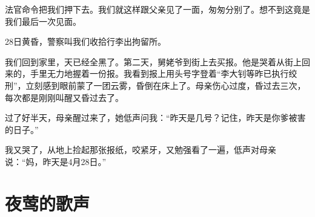 \documentclass[12pt,UTF-8,openany]{ctexbook}
\begin{document}
\begin{large}
    法官命令把我们押下去。我们就这样跟父亲见了一面，匆匆分别了。想不到这竟是我们最后一次见面。
    
    28日黄昏，警察叫我们收拾行李出拘留所。
    
    我们回到家里，天已经全黑了。第二天，舅姥爷到街上去买报。他是哭着从街上回来的，手里无力地握着一份报。我看到报上用头号字登着“李大钊等昨已执行绞刑”，立刻感到眼前蒙了一团云雾，昏倒在床上了。母亲伤心过度，昏过去三次，每次都是刚刚叫醒又昏过去了。
    
    过了好半天，母亲醒过来了，她低声问我：“昨天是几号？记住，昨天是你爹被害的日子。”
    
    我又哭了，从地上捡起那张报纸，咬紧牙，又勉强看了一遍，低声对母亲说：“妈，昨天是4月28日。”
    
\end{large}



\chapter{夜莺的歌声}
\end{document}
